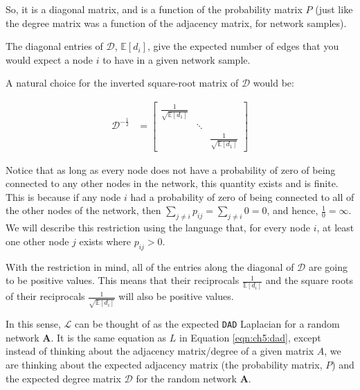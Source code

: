 So, it is a diagonal matrix, and is a function of the probability matrix $P$ (just like the degree matrix was a function of the adjacency matrix, for network samples). 

The diagonal entries of $\mathcal D$, $\mathbb E[d_i]$, give the expected number of edges that you would expect a node $i$ to  have in a given network sample.

A natural choice for the inverted square-root matrix of $\mathcal D$ would be:

\begin{align*}
    \mathcal D^{-\frac{1}{2}} &= \begin{bmatrix}
        \frac{1}{\sqrt{\mathbb E[d_1]}} & & \\
        & \ddots & \\
        & & \frac{1}{\sqrt{\mathbb E[d_1]}}
    \end{bmatrix} 
\end{align*}

Notice that as long as every node does not have a probability of zero of being connected to any other nodes in the network, this quantity exists and is finite. This is because if any node $i$ had a probability of zero of being connected to all of the other nodes of the network, then $\sum_{j \neq i} p_{ij} = \sum_{j \neq i} 0 = 0$, and hence, $\frac{1}{0} = \infty$. We will describe this restriction using the language that, for every node $i$, at least one other node $j$ exists where $p_{ij} > 0$.

With the restriction in mind, all of the entries along the diagonal of $\mathcal D$ are going to be positive values. This means that their reciprocals $\frac{1}{\mathbb E[d_i]}$ and the square roots of their reciprocals $\frac{1}{\sqrt{\mathbb E[d_i]}}$ will also be positive values.

In this sense, $\mathcal L$ can be thought of as the expected \texttt{DAD} Laplacian for a random network $\mathbf A$. It is the same equation as $L$ in Equation \eqref{eqn:ch5:dad}, except instead of thinking about the adjacency matrix/degree of a given matrix $A$, we are thinking about the expected adjacency matrix (the probability matrix, $P$) and the expected degree matrix $\mathcal D$ for the random network $\mathbf A$. 

\newpage